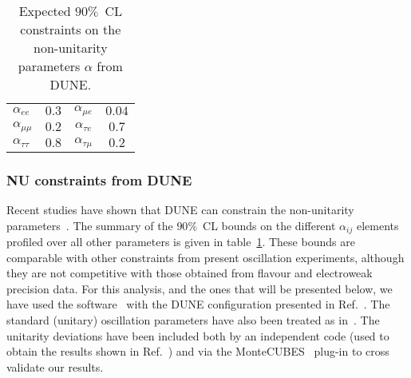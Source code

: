 \begin{table}[htb]
\caption[Expected $90 \%$~CL constraints on the non-unitarity parameters $\alpha$]{\label{tab:bounds} Expected $90 \%$~CL constraints on the non-unitarity parameters $\alpha$ from DUNE. }
\begin{center}
\renewcommand{\arraystretch}{1.6}
\begin{tabular}{  l@{\quad\quad}  c@{\quad\quad}   c@{\quad\quad}   c@{\quad\quad}      }
\hline
$\alpha_{ee}$ & $0.3$ & $\alpha_{\mu e}$ & $0.04$  \\
$\alpha_{\mu\mu}$ & $0.2$ & $\alpha_{\tau e}$ & $0.7$ \\
$\alpha_{\tau\tau}$ & $0.8$ & $\alpha_{\tau\mu}$ & $0.2$  \\ \hline
\end{tabular}
\end{center}
\end{table}

\subsubsection{NU constraints from DUNE}
Recent studies have shown that DUNE can constrain the non-unitarity parameters~\cite{Blennow:2016jkn, Escrihuela:2016ube}. The summary of the $90 \%$~CL bounds on the different $\alpha_{ij}$ elements profiled over all other parameters is given in table~\ref{tab:bounds}.
These bounds are comparable with other constraints from present oscillation experiments, although they are not competitive with those obtained from flavour and electroweak precision data.
For this analysis, and the ones that will be presented below, we have used the   software~\cite{Huber:2004ka,Huber:2007ji} with the DUNE  configuration presented in Ref.~\cite{Alion:2016uaj}. The standard (unitary) oscillation parameters have also been treated as in~\cite{Alion:2016uaj}. The unitarity deviations have been included both by an independent code (used to obtain the results shown in Ref.~\cite{Escrihuela:2016ube}) and via the MonteCUBES~\cite{Blennow:2009pk} plug-in to cross validate our results.

